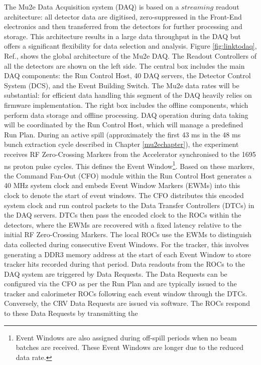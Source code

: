 The Mu2e Data Acquisition system (DAQ) is based on a $streaming$ readout architecture: 
all detector data are digitised, zero-suppressed in the 
Front-End electronics 
and then transferred from the detectors for further 
processing and storage. 
This architecture results in a large data throughput in 
the DAQ but offers a 
significant flexibility for data selection and analysis. 
Figure \ref{fig:linktodaq}, Ref.\cite{GIOIOSA2023167732}, 
shows the global 
architecture of the Mu2e DAQ. 
The Readout Controllers of all the detectors are shown 
on the left side. The central box includes the main DAQ 
components: the Run Control Host, 40 DAQ servers, the 
Detector Control System (DCS), and the Event Building 
Switch. The Mu2e data rates will be substantial: for 
efficient data handling this segment of the DAQ heavily 
relies on firmware implementation. The right box includes 
the offline components, which perform data storage and 
offline processing. DAQ operation during data taking will be coordinated by the Run Control Host, 
which will manage a predefined Run Plan. During an active spill (approximately the first 
43 ms in the 48 ms bunch extraction cycle described in Chapter \ref{mu2echapter}), 
the experiment receives RF Zero-Crossing Markers from the Accelerator 
synchronised to the 1695 ns proton pulse cycles. This defines the 
Event Window\footnote{Event Windows are also assigned during off-spill periods 
when no beam batches are received. 
These Event Windows are longer due to the reduced data rate.}. 
Based on these markers, the Command Fan-Out (CFO) module within the 
Run Control Host generates a 40 MHz system clock and embeds Event 
Window Markers (EWMs) into this clock to denote the start of event 
windows. The CFO distributes this encoded system clock and run control 
packets to the Data Transfer Controllers (DTCs) in the DAQ servers. 
DTCs then pass the encoded clock to the ROCs within the detectors, 
where the EWMs are recovered with a fixed latency relative to the 
initial RF Zero-Crossing Markers. The local ROCs use the EWMs to distinguish 
data collected during consecutive Event Windows. For the tracker, 
this involves generating a DDR3 memory address at the start of each 
Event Window to store tracker hits recorded during that period. 
Data readouts from the ROCs to the DAQ system are triggered by Data Requests. 
The Data Requests can be configured via the CFO as per the Run Plan and are 
typically issued to the tracker and calorimeter ROCs following each event 
window through the DTCs. Conversely, the CRV Data Requests are issued via 
software. The ROCs respond to these Data Requests by transmitting the 
